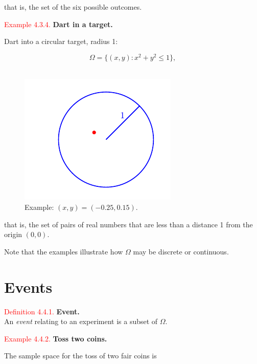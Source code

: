 \documentclass[
]{book}
\begin{document}
that is, the set of the six possible outcomes.

\hfill\break

\leavevmode{}%
\textcolor{red}{Example 4.3.4.}
{\textbf{Dart in a target.}}

Dart into a circular target, radius 1:

\[\Omega = \{ (x,y): x^2 + y^2 \leq 1\},\]\\

\begin{figure}
\includegraphics[width=0.8\linewidth]{Images/dart1} \caption{ Example: $(x,y) =(-0.25,0.15)$.}\label{fig:dart1}
\end{figure}

that is, the set of pairs of real numbers that are less than a distance 1 from the origin \((0,0)\).

Note that the examples illustrate how \(\Omega\) may be discrete or continuous.

\hypertarget{prob:events}{%
\section{Events}\label{prob:events}}

\leavevmode{}%
\textcolor{red}{Definition 4.4.1.}
{\textbf{Event.}}\\
An \emph{event} relating to an experiment is a subset of \(\Omega\).

\leavevmode{}%
\textcolor{red}{Example 4.4.2.}
{\textbf{Toss two coins.}}

The sample space for the toss of two fair coins is
\end{document}
